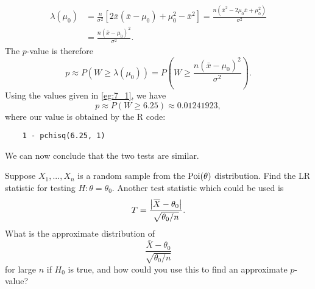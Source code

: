 \documentclass[notoc,notitlepage]{tufte-book}
\begin{document}
\begin{solution}
\begin{align*}
    \lambda(\mu_0) &= \frac{n}{\sigma^2} [ 2 \bar{x}( \bar{x} - \mu_0 ) + \mu_0^2 - \bar{x}^2 ] = \frac{n ( \bar{x}^2 - 2 \mu_0 \bar{x} + \mu_0^2 )}{\sigma^2} \\
                   &= \frac{n (\bar{x} - \mu_0)^2}{\sigma^2}.
  \end{align*}
  The $p$-value is therefore
  \begin{equation*}
    p \approx P(W \geq \lambda(\mu_0)) = P\left(W \geq \frac{n (\bar{x} - \mu_0)^2}{\sigma^2}\right).
  \end{equation*}
  Using the values given in \cref{eg:7_1}, we have
  \begin{equation*}
    p \approx P(W \geq 6.25) \approx 0.01241923,
  \end{equation*}
  where our value is obtained by the R code:
  \begin{lstlisting}
    1 - pchisq(6.25, 1)
  \end{lstlisting}
  We can now conclude that the two tests are similar.
\end{solution}

\begin{eg}
  Suppose $X_1, ..., X_n$ is a random sample from the $\operatorname{Poi}(\theta)$ distribution. Find the LR statistic for testing $H : \theta = \theta_0$. Another test statistic which could be used is
  \begin{equation*}
    T = \frac{\abs{\bar{X} - \theta_0}}{\sqrt{\theta_0 / n}}.
  \end{equation*}
  What is the approximate distribution of
  \begin{equation*}
    \frac{\bar{X} - \theta_0}{\sqrt{\theta_0 / n}}
  \end{equation*}
  for large $n$ if $H_0$ is true, and how could you use this to find an approximate $p$-value?
\end{eg}
\end{document}
